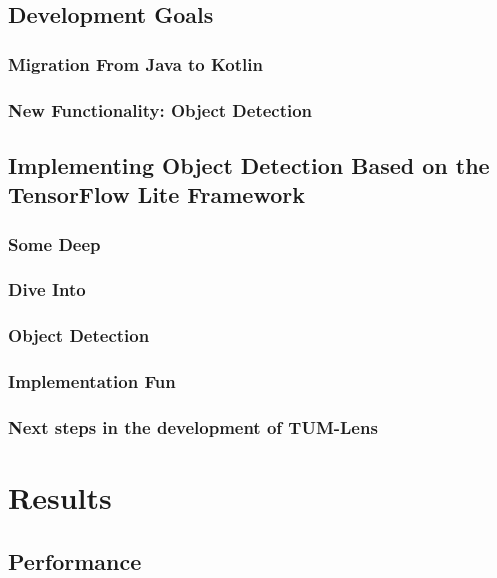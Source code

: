 \documentclass[
			   fontsize=11pt,
               paper=a4,
               bibliography=totoc,
               idxtotoc,
               headsepline,
               footsepline,
               footinclude=false,
               BCOR=12mm,
               DIV=13,
               openany,   %
               ]
               {scrbook}
\begin{document}
\section{Development Goals}

\subsection{Migration From Java to Kotlin}

\subsection{New Functionality: Object Detection}

\section{Implementing Object Detection Based on the TensorFlow Lite Framework}

\subsection{Some Deep}
\subsection{Dive Into}
\subsection{Object Detection}
\subsection{Implementation Fun}

\subsection{Next steps in the development of TUM-Lens}


\chapter{Results}

\section{Performance}
\end{document}
